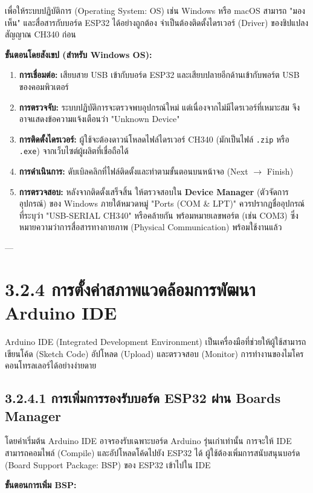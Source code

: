 \documentclass[11pt,a4paper,openany]{report}
\begin{document}
เพื่อให้ระบบปฏิบัติการ (Operating System: OS) เช่น Windows หรือ macOS สามารถ "มองเห็น" และสื่อสารกับบอร์ด ESP32 ได้อย่างถูกต้อง จำเป็นต้องติดตั้งไดรเวอร์ (Driver) ของชิปแปลงสัญญาณ CH340 ก่อน

\textbf{ขั้นตอนโดยสังเขป (สำหรับ Windows OS):}

\begin{enumerate}
  \item \textbf{การเชื่อมต่อ:} เสียบสาย USB เข้ากับบอร์ด ESP32 และเสียบปลายอีกด้านเข้ากับพอร์ต USB ของคอมพิวเตอร์
  \item \textbf{การตรวจจับ:} ระบบปฏิบัติการจะตรวจพบอุปกรณ์ใหม่ แต่เนื่องจากไม่มีไดรเวอร์ที่เหมาะสม จึงอาจแสดงข้อความแจ้งเตือนว่า "Unknown Device"
  \item \textbf{การติดตั้งไดรเวอร์:} ผู้ใช้จะต้องดาวน์โหลดไฟล์ไดรเวอร์ CH340 (มักเป็นไฟล์ \texttt{.zip} หรือ \texttt{.exe}) จากเว็บไซต์ผู้ผลิตที่เชื่อถือได้
  \item \textbf{การดำเนินการ:} ดับเบิลคลิกที่ไฟล์ติดตั้งและทำตามขั้นตอนบนหน้าจอ (Next $\rightarrow$ Finish)
  \item \textbf{การตรวจสอบ:} หลังจากติดตั้งเสร็จสิ้น ให้ตรวจสอบใน \textbf{Device Manager} (ตัวจัดการอุปกรณ์) ของ Windows ภายใต้หมวดหมู่ "Ports (COM \& LPT)" ควรปรากฏชื่ออุปกรณ์ที่ระบุว่า "USB-SERIAL CH340" หรือคล้ายกัน พร้อมหมายเลขพอร์ต (เช่น COM3) ซึ่งหมายความว่าการสื่อสารทางกายภาพ (Physical Communication) พร้อมใช้งานแล้ว
\end{enumerate}


---

\section{3.2.4 การตั้งค่าสภาพแวดล้อมการพัฒนา Arduino IDE}


Arduino IDE (Integrated Development Environment) เป็นเครื่องมือที่ช่วยให้ผู้ใช้สามารถเขียนโค้ด (Sketch Code) อัปโหลด (Upload) และตรวจสอบ (Monitor) การทำงานของไมโครคอนโทรลเลอร์ได้อย่างง่ายดาย

\subsection{3.2.4.1 การเพิ่มการรองรับบอร์ด ESP32 ผ่าน Boards Manager}


โดยค่าเริ่มต้น Arduino IDE อาจรองรับเฉพาะบอร์ด Arduino รุ่นเก่าเท่านั้น การจะให้ IDE สามารถคอมไพล์ (Compile) และอัปโหลดโค้ดไปยัง ESP32 ได้ ผู้ใช้ต้องเพิ่มการสนับสนุนบอร์ด (Board Support Package: BSP) ของ ESP32 เข้าไปใน IDE

\textbf{ขั้นตอนการเพิ่ม BSP:}
\end{document}
